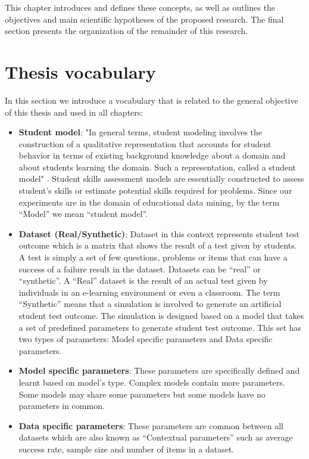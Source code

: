 This chapter introduces and defines these concepts, as well as outlines the objectives and main scientific hypotheses of the proposed research. The final section presents the organization of the remainder of this research.

\section{Thesis vocabulary}

In this section we introduce a vocabulary that is related to the general objective of this thesis and used in all chapters:

\begin{itemize}
\item \textbf{Student model}: "In general terms, student modeling involves the construction of a qualitative representation that accounts for student behavior in terms of existing background knowledge about a domain and about students learning the domain. Such a representation, called a student model" \citep{sison1998student}. Student skills assessment models are essentially constructed to assess student's skills or estimate potential skills required for problems. Since our experiments are in the domain of educational data mining, by the term ``Model'' we mean ``student model''. 
\item \textbf{Dataset (Real/Synthetic)}: Dataset in this context represents student test outcome which is a matrix that shows the result of a test given by students. A test is simply a set of few questions, problems or items that can have a success of a failure result in the dataset. Datasets can be ``real'' or ``synthetic''. A ``Real'' dataset is the result of an actual test given by individuals in an e-learning environment or even a classroom. The term ``Synthetic'' means that a simulation is involved to generate an artificial student test outcome. The simulation is designed based on a model that takes a set of predefined parameters to generate student test outcome. This set has two types of parameters: Model specific parameters and Data specific parameters.
\item \textbf{Model specific parameters}: These parameters are specifically defined and learnt based on model's type. Complex models contain more parameters. Some models may share some parameters but some models have no parameters in common.
\item \textbf{Data specific parameters}: These parameters are common between all datasets which are also known as ``Contextual parameters'' such as average success rate, sample size and number of items in a dataset.

\end{itemize}
